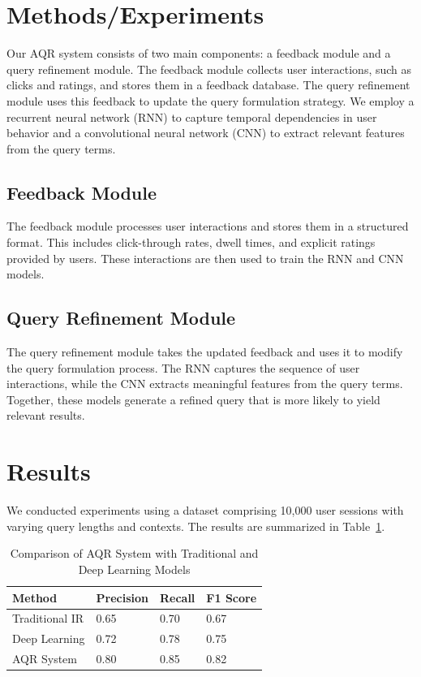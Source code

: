 \documentclass{article}
\begin{document}
\section{Methods/Experiments}
Our AQR system consists of two main components: a feedback module and a query refinement module. The feedback module collects user interactions, such as clicks and ratings, and stores them in a feedback database. The query refinement module uses this feedback to update the query formulation strategy. We employ a recurrent neural network (RNN) to capture temporal dependencies in user behavior and a convolutional neural network (CNN) to extract relevant features from the query terms.

\subsection{Feedback Module}
The feedback module processes user interactions and stores them in a structured format. This includes click-through rates, dwell times, and explicit ratings provided by users. These interactions are then used to train the RNN and CNN models.

\subsection{Query Refinement Module}
The query refinement module takes the updated feedback and uses it to modify the query formulation process. The RNN captures the sequence of user interactions, while the CNN extracts meaningful features from the query terms. Together, these models generate a refined query that is more likely to yield relevant results.

\section{Results}
We conducted experiments using a dataset comprising 10,000 user sessions with varying query lengths and contexts. The results are summarized in Table~\ref{tab:results}.

\begin{table}[ht]
\centering
\caption{Comparison of AQR System with Traditional and Deep Learning Models}
\label{tab:results}
\begin{tabular}{@{}llll@{}}
\toprule
Method & Precision & Recall & F1 Score \\ \midrule
Traditional IR & 0.65 & 0.70 & 0.67 \\
Deep Learning & 0.72 & 0.78 & 0.75 \\
AQR System & 0.80 & 0.85 & 0.82 \\ \bottomrule
\end{tabular}
\end{table}
\end{document}
